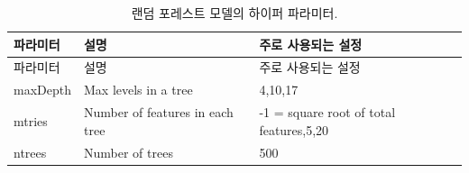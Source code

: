\documentclass[10.5pt]{book}
\theoremstyle{definition}
\theoremstyle{definition}
\theoremstyle{definition}
\theoremstyle{remark}
\begin{document}
\begin{longtable}[]{@{}lll@{}}
\caption{\label{tab:randomForestParameters} 랜덤 포레스트 모델의 하이퍼
파라미터.}\tabularnewline
\toprule
\begin{minipage}[b]{0.13\columnwidth}\raggedright\strut
파라미터\strut
\end{minipage} & \begin{minipage}[b]{0.16\columnwidth}\raggedright\strut
설명\strut
\end{minipage} & \begin{minipage}[b]{0.20\columnwidth}\raggedright\strut
주로 사용되는 설정\strut
\end{minipage}\tabularnewline
\midrule
\endfirsthead
\toprule
\begin{minipage}[b]{0.13\columnwidth}\raggedright\strut
파라미터\strut
\end{minipage} & \begin{minipage}[b]{0.16\columnwidth}\raggedright\strut
설명\strut
\end{minipage} & \begin{minipage}[b]{0.20\columnwidth}\raggedright\strut
주로 사용되는 설정\strut
\end{minipage}\tabularnewline
\midrule
\endhead
\begin{minipage}[t]{0.13\columnwidth}\raggedright\strut
maxDepth\strut
\end{minipage} & \begin{minipage}[t]{0.16\columnwidth}\raggedright\strut
Max levels in a tree\strut
\end{minipage} & \begin{minipage}[t]{0.20\columnwidth}\raggedright\strut
4,10,17\strut
\end{minipage}\tabularnewline
\begin{minipage}[t]{0.13\columnwidth}\raggedright\strut
mtries\strut
\end{minipage} & \begin{minipage}[t]{0.16\columnwidth}\raggedright\strut
Number of features in each tree\strut
\end{minipage} & \begin{minipage}[t]{0.20\columnwidth}\raggedright\strut
-1 = square root of total features,5,20\strut
\end{minipage}\tabularnewline
\begin{minipage}[t]{0.13\columnwidth}\raggedright\strut
ntrees\strut
\end{minipage} & \begin{minipage}[t]{0.16\columnwidth}\raggedright\strut
Number of trees\strut
\end{minipage} & \begin{minipage}[t]{0.20\columnwidth}\raggedright\strut
500\strut
\end{minipage}\tabularnewline
\bottomrule
\end{longtable}
\end{document}
